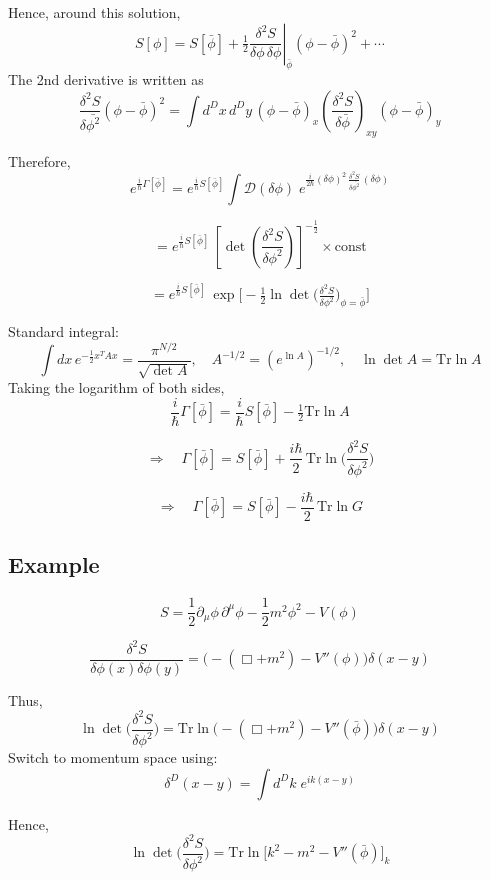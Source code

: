 \documentclass[14pt]{article} %
\begin{document}
Hence, around this solution,
\[
S[\phi] = S[\bar{\phi}] + \tfrac{1}{2} \left.\frac{\delta^2 S}{\delta \phi \, \delta \phi}\right|_{\bar{\phi}} (\phi - \bar{\phi})^2 + \cdots
\]
The 2nd derivative is written as 
\[
\frac{\delta^2 S}{\delta \bar{\phi^2}} (\phi - \bar{\phi})^2 = \int d^Dx \, d^Dy \, (\phi - \bar{\phi})_x \left( \frac{\delta^2 S}{\delta \bar{\phi}}\right)_{xy} (\phi - \bar{\phi})_y
\]

Therefore,
\[
e^{\tfrac{i}{\hbar} \Gamma[\bar{\phi}]} 
= e^{\tfrac{i}{\hbar} S[\bar{\phi}]} 
\int \mathcal{D}(\delta \phi) \;
e^{\tfrac{i}{2\hbar} (\delta \phi)^2 \,
\frac{\delta^2 S}{\delta \bar{\phi^2}} \,
(\delta \phi)}
\]

\[
= e^{\tfrac{i}{\hbar} S[\bar{\phi}]} \,
\left[ \det\left( \frac{\delta^2 S}{\delta \phi^2} \right) \right]^{-\tfrac{1}{2}} \times \text{const}
\]

\[
= e^{\tfrac{i}{\hbar} S[\bar{\phi}]} \,
\exp\!\Bigg[ -\tfrac{1}{2} \ln \det \Big( \tfrac{\delta^2 S}{\delta \phi^2} \Big)_{\phi=\bar{\phi}} \Bigg]
\]

Standard integral:
\[
\int dx \, e^{-\tfrac{1}{2} x^T A x} 
= \frac{\pi^{N/2}}{\sqrt{\det A}}, 
\quad 
A^{-1/2} = (e^{\ln A})^{-1/2}, 
\quad 
\ln \det A = \mathrm{Tr} \ln A
\]
Taking the logarithm of both sides,
\[
\frac{i}{\hbar} \Gamma[\bar{\phi}]
= \frac{i}{\hbar} S[\bar{\phi}] - \tfrac{1}{2} \mathrm{Tr} \ln A
\]

\[
\Rightarrow \quad
\Gamma[\bar{\phi}]
= S[\bar{\phi}] + \frac{i\hbar}{2} \, \mathrm{Tr} \ln \Big( \frac{\delta^2 S}{\delta \phi^2} \Big)
\]

\[
\Rightarrow \quad
\Gamma[\bar{\phi}] = S[\bar{\phi}] - \frac{i\hbar}{2} \, \mathrm{Tr} \ln G
\]

\subsection*{Example}

\[
S = 
\frac{1}{2}\partial_\mu \phi \, \partial^\mu \phi 
- \frac{1}{2} m^2 \phi^2 - V(\phi) 
\]

\[
\frac{\delta^2 S}{\delta \phi(x) \delta \phi(y)} 
= \Big( - (\Box + m^2) - V''(\phi) \Big) \delta(x-y)
\]

Thus,
\[
\ln \det \Big( \frac{\delta^2 S}{\delta \phi^2} \Big) 
= \mathrm{Tr} \ln \Big( - (\Box + m^2) - V''(\bar{\phi}) \Big) \delta(x-y)
\]
Switch to momentum space using:
\[
\delta^D(x-y) = \int d^Dk \; e^{ik(x-y)}
\]

Hence,
\[
\ln \det \Big( \frac{\delta^2 S}{\delta \phi^2} \Big) 
= \mathrm{Tr} \ln \Big[ k^2 - m^2 - V''(\bar{\phi}) \Big]_k
\]
\end{document}
